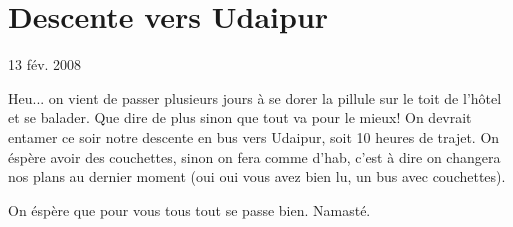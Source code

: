 \section{Descente vers Udaipur}

13 fév. 2008

\begin{multicols}{2}

Heu... on vient de passer plusieurs jours à se dorer la pillule sur le toit de l'hôtel et se balader. Que dire de plus sinon que tout va pour le mieux! On devrait entamer ce soir notre descente en bus vers Udaipur, soit 10 heures de trajet. On éspère avoir des couchettes, sinon on fera comme d'hab, c'est à dire on changera nos plans au dernier moment (oui oui vous avez bien lu, un bus avec couchettes).

On éspère que pour vous tous tout se passe bien. Namasté.

\end{multicols}



